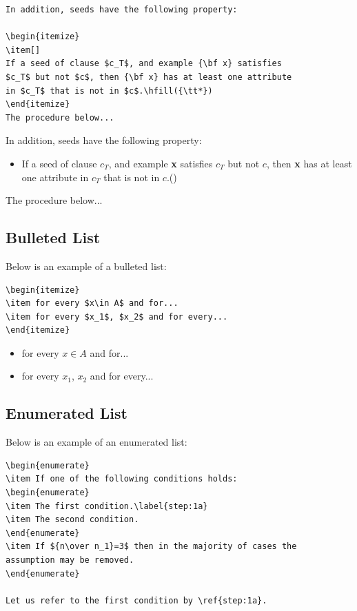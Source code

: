 \documentclass[notnumberedtheorems,withtitlethanks]{actacyb}
\begin{document}
\begin{verbatim}
In addition, seeds have the following property:

\begin{itemize}
\item[] 
If a seed of clause $c_T$, and example {\bf x} satisfies 
$c_T$ but not $c$, then {\bf x} has at least one attribute 
in $c_T$ that is not in $c$.\hfill({\tt*})
\end{itemize}
The procedure below...
\end{verbatim}

In addition, seeds have the following property:

\begin{itemize}
\item[] 
If a seed of clause $c_T$, and example {\bf x} satisfies $c_T$ but
not $c$, then {\bf x} has at least one attribute in $c_T$ that
is not in $c$.\hfill({\tt*})
\end{itemize}
The procedure below...

\subsection{Bulleted List}

Below is an example of a bulleted list:

\begin{verbatim}
\begin{itemize}
\item for every $x\in A$ and for...
\item for every $x_1$, $x_2$ and for every...
\end{itemize} 
\end{verbatim}

\begin{itemize}
\item for every $x\in A$ and for...
\item for every $x_1$, $x_2$ and for every...
\end{itemize} 

\subsection{Enumerated List}
Below is an example of an enumerated list:

\begin{verbatim}
\begin{enumerate}
\item If one of the following conditions holds:
\begin{enumerate}
\item The first condition.\label{step:1a}
\item The second condition.
\end{enumerate}
\item If ${n\over n_1}=3$ then in the majority of cases the 
assumption may be removed.
\end{enumerate}

Let us refer to the first condition by \ref{step:1a}.
\end{verbatim}
\end{document}
